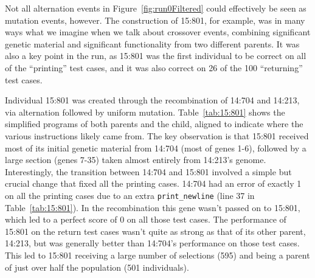 Not all alternation events in Figure~\ref{fig:run0Filtered} could effectively be seen as
mutation events, however. The construction of 15:801, for example,
was in many ways what we imagine when we talk about
crossover events, combining significant genetic material and significant functionality from two different parents. It was also a key point in the run,
as 15:801 was the first individual to be correct on all of the ``printing''
test cases, and it was also correct on 26 of the 100 ``returning'' test cases.

Individual 15:801 was created through the recombination of 14:704 and 14:213,
via alternation followed by uniform mutation. 
Table~\ref{tab:15:801} shows the simplified programs of 
both parents and the child,
aligned to indicate where the various instructions likely came from. The key
observation is that 15:801 received most of its initial genetic material from 
14:704 (most of genes 1-6), followed by a large section (genes 7-35) taken
almost entirely from 14:213's genome. Interestingly, the transition between 14:704 and 15:801 involved a simple but crucial change that fixed all the
printing cases. 14:704 had an error of exactly 1 on all the printing cases
due to an extra \texttt{print\_newline} (line 37 in Table~\ref{tab:15:801}).
In the recombination this gene wasn't passed on to 15:801, which led to a
perfect score of 0 on all those test cases. The performance of 15:801 on
the return test cases wasn't quite as strong as that of its other parent,
14:213, but was generally better than 14:704's performance on those test cases. This led to 15:801 receiving a large number of selections (595) and being
a parent of just over half the population (501 individuals).

